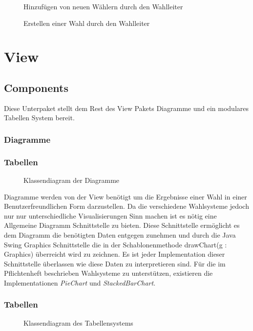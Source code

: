 \documentclass[parskip=full]{scrartcl}
\begin{document}
	\begin{sidewaysfigure}[!h]
		\centering
		
		\caption{Hinzufügen von neuen Wählern durch den Wahlleiter}
	\end{sidewaysfigure}
	\begin{sidewaysfigure}[!h]
		\centering
		
		\caption{Erstellen einer Wahl durch den Wahlleiter}
	\end{sidewaysfigure}
	\pagebreak	


	\section{View}
		\subsection{Components}
		Diese Unterpaket stellt dem Rest des View Pakets Diagramme und ein modulares Tabellen System bereit.
		
		\subsubsection{Diagramme}
		\subsubsection{Tabellen}
		\begin{figure}[!h]
			\centering
			
			\caption{Klassendiagram der Diagramme}
		\end{figure}
		
		Diagramme werden von der View benötigt um die Ergebnisse einer Wahl in einer Benutzerfreundlichen Form darzustellen. Da die verschiedene Wahlsysteme jedoch nur nur unterschiedliche Visualisierungen Sinn machen ist es nötig eine Allgemeine Diagramm Schnittstelle zu bieten. Diese Schnittstelle ermöglicht es dem Diagramm die benötigten Daten entgegen zunehmen und durch die Java Swing Graphics Schnittstelle die in der Schablonenmethode drawChart(g : Graphics) überreicht wird zu zeichnen. Es ist jeder Implementation dieser Schnittstelle überlassen wie diese Daten zu interpretieren sind. Für die im Pflichtenheft beschrieben Wahlsysteme zu unterstützen, existieren die Implementationen \textit{PieChart} und \textit{StackedBarChart}.
		
		\subsubsection{Tabellen}
		\begin{figure}[!h]
		\centering
		
		\caption{Klassendiagram des Tabellensystems}
		\end{figure}
		
\end{document}

